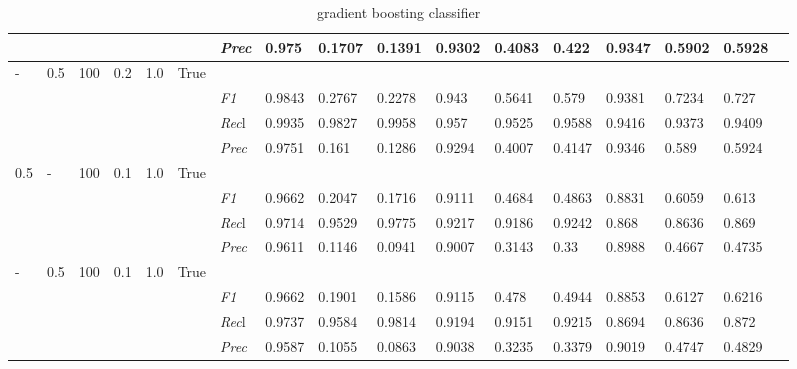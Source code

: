 \begin{table}[]
\begin{tabularx}{\textwidth}{XXXXXX|X|XXX|XXX|XXXX}
& & & & & & \textit{Prec} & 0.975 & 0.1707 & 0.1391 & 0.9302 & 0.4083 & 0.422 & 0.9347 & 0.5902 & 0.5928 \\ \midrule
- & 0.5 & 100 & 0.2 & 1.0 &True & & & & & & & & & \\
& & & & & & \textit{F1} & 0.9843 & 0.2767 & 0.2278 & 0.943 & 0.5641        & 0.579        & 0.9381        & 0.7234        & 0.727        \\
& & & & & & \textit{Rec}l & 0.9935 & 0.9827 & 0.9958    & 0.957 & 0.9525    & 0.9588    & 0.9416    & 0.9373    & 0.9409    \\
& & & & & & \textit{Prec} & 0.9751 & 0.161 & 0.1286 & 0.9294 & 0.4007 & 0.4147 & 0.9346 & 0.589 & 0.5924 \\ \midrule
0.5 & - & 100 & 0.1 & 1.0 &True & & & & & & & & & \\
& & & & & & \textit{F1} & 0.9662 & 0.2047 & 0.1716 & 0.9111 & 0.4684        & 0.4863        & 0.8831        & 0.6059        & 0.613        \\
& & & & & & \textit{Rec}l & 0.9714 & 0.9529 & 0.9775    & 0.9217 & 0.9186    & 0.9242    & 0.868    & 0.8636    & 0.869    \\
& & & & & & \textit{Prec} & 0.9611 & 0.1146 & 0.0941 & 0.9007 & 0.3143 & 0.33 & 0.8988 & 0.4667 & 0.4735 \\ \midrule
- & 0.5 & 100 & 0.1 & 1.0 &True & & & & & & & & & \\
& & & & & & \textit{F1} & 0.9662 & 0.1901 & 0.1586 & 0.9115 & 0.478        & 0.4944        & 0.8853        & 0.6127        & 0.6216        \\
& & & & & & \textit{Rec}l & 0.9737 & 0.9584 & 0.9814    & 0.9194 & 0.9151    & 0.9215    & 0.8694    & 0.8636    & 0.872    \\
& & & & & & \textit{Prec} & 0.9587 & 0.1055 & 0.0863 & 0.9038 & 0.3235 & 0.3379 & 0.9019 & 0.4747 & 0.4829 \\ \midrule
\end{tabularx}
\caption{gradient boosting classifier}
\label{tab:all_results_gradient_boosting_classifier}
\end{table}

